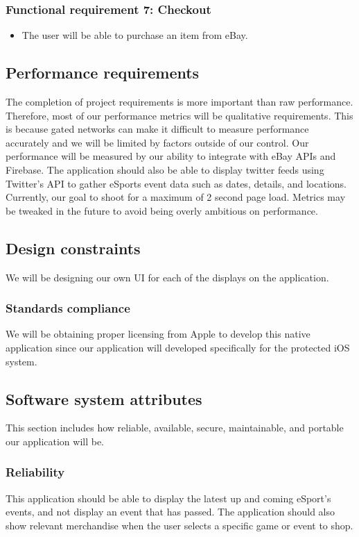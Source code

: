 \documentclass[onecolumn, draftclsnofoot,10pt, compsoc]{IEEEtran}
\begin{document}
\subsubsection{Functional requirement 7: Checkout}
\begin{itemize}
\item The user will be able to purchase an item from eBay.
\end{itemize}

\subsection{Performance requirements}
The completion of project requirements is more important than raw performance. Therefore, most of our performance
metrics will be qualitative requirements.  This is because gated networks can make it difficult to measure performance accurately and we will be limited by factors outside of our control. Our performance will be measured by our ability to integrate with eBay APIs and Firebase. The application should also be able to display twitter feeds using Twitter’s API 
to gather eSports event data such as dates, details, and locations. Currently, our goal to shoot for a maximum of 2 second page load. Metrics may be tweaked in the future to avoid being overly ambitious on performance.

\subsection{Design constraints}
 We will be designing our own UI for each of the displays on the application. 
 
\subsubsection{Standards compliance}
  We will be obtaining proper licensing from Apple to develop this native application since our application will developed specifically for the protected iOS system.

\subsection{Software system attributes}
This section includes how reliable, available, secure, maintainable, and portable our application will be.

\subsubsection{Reliability}
This application should be able to display the latest up and coming eSport's events, and not display an event that has passed. The application should also show relevant merchandise when the user selects a specific game or event to shop.
\end{document}
